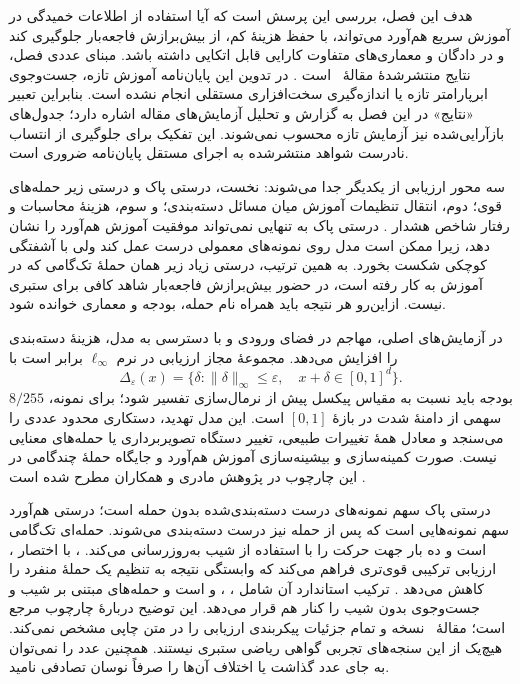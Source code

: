 \label{chap:experiments}

هدف این فصل، بررسی این پرسش است که آیا استفاده از اطلاعات خمیدگی در آموزش سریع هم‌آورد می‌تواند، با حفظ هزینهٔ کم، از بیش‌برازش فاجعه‌بار جلوگیری کند و در دادگان و معماری‌های متفاوت کارایی قابل اتکایی داشته باشد. مبنای عددی فصل، نتایج منتشرشدهٔ مقالهٔ \sora\ است \cite{sora2026}. در تدوین این پایان‌نامه آموزش تازه، جست‌وجوی ابرپارامتر تازه یا اندازه‌گیری سخت‌افزاری مستقلی انجام نشده است. بنابراین تعبیر «نتایج» در این فصل به گزارش و تحلیل آزمایش‌های مقاله اشاره دارد؛ جدول‌های بازآرایی‌شده نیز آزمایش تازه محسوب نمی‌شوند. این تفکیک برای جلوگیری از انتساب نادرست شواهد منتشرشده به اجرای مستقل پایان‌نامه ضروری است.

سه محور ارزیابی از یکدیگر جدا می‌شوند: نخست، درستی پاک و درستی زیر حمله‌های قوی؛ دوم، انتقال تنظیمات آموزش میان مسائل دسته‌بندی؛ و سوم، هزینهٔ محاسبات و رفتار شاخص هشدار \pertalign. درستی پاک به تنهایی نمی‌تواند موفقیت آموزش هم‌آورد را نشان دهد، زیرا ممکن است مدل روی نمونه‌های معمولی درست عمل کند ولی با آشفتگی کوچکی شکست بخورد. به همین ترتیب، درستی زیاد زیر همان حملهٔ تک‌گامی که در آموزش به کار رفته است، در حضور بیش‌برازش فاجعه‌بار شاهد کافی برای ستبری نیست. ازاین‌رو هر نتیجه باید همراه نام حمله، بودجه و معماری خوانده شود.

در آزمایش‌های اصلی، مهاجم در فضای ورودی و با دسترسی به مدل، هزینهٔ دسته‌بندی را افزایش می‌دهد. مجموعهٔ مجاز ارزیابی در نرم $\ell_\infty$ برابر است با
\begin{equation}
 \Delta_\varepsilon(x)=\{\delta:\|\delta\|_\infty\leq\varepsilon,\quad x+\delta\in[0,1]^d\}.
 \label{eq:exp-threat}
\end{equation}
بودجه باید نسبت به مقیاس پیکسل پیش از نرمال‌سازی تفسیر شود؛ برای نمونه، $8/255$ سهمی از دامنهٔ شدت در بازهٔ $[0,1]$ است. این مدل تهدید، دستکاری محدود عددی را می‌سنجد و معادل همهٔ تغییرات طبیعی، تغییر دستگاه تصویربرداری یا حمله‌های معنایی نیست. صورت کمینه‌سازی و بیشینه‌سازی آموزش هم‌آورد و جایگاه حملهٔ چندگامی در این چارچوب در پژوهش مادری و همکاران مطرح شده است \cite{madry2018towards}.

درستی پاک سهم نمونه‌های درست دسته‌بندی‌شده بدون حمله است؛ درستی هم‌آورد سهم نمونه‌هایی است که پس از حمله نیز درست دسته‌بندی می‌شوند.  حمله‌ای تک‌گامی است و  ده بار جهت حرکت را با استفاده از شیب به‌روزرسانی می‌کند. ، با اختصار ، ارزیابی ترکیبی قوی‌تری فراهم می‌کند که وابستگی نتیجه به تنظیم یک حملهٔ منفرد را کاهش می‌دهد \cite{croce2020reliable}. ترکیب استاندارد آن شامل ، ،  و  است و حمله‌های مبتنی بر شیب و جست‌وجوی بدون شیب را کنار هم قرار می‌دهد. این توضیح دربارهٔ چارچوب مرجع است؛ مقالهٔ \sora\ نسخه و تمام جزئیات پیکربندی ارزیابی را در متن چاپی مشخص نمی‌کند. هیچ‌یک از این سنجه‌های تجربی گواهی ریاضی ستبری نیستند. همچنین عدد  را نمی‌توان به جای عدد  گذاشت یا اختلاف آن‌ها را صرفاً نوسان تصادفی نامید.

